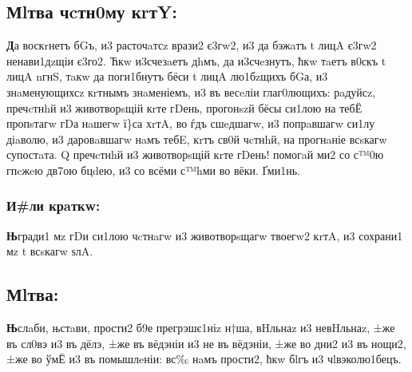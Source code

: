 \subsection{Мlтва чcтн0му кrтY:}

\textbf{Д}а воскrнетъ бGъ, и3 расточaтсz врази2 є3гw2, и3 да бэжaтъ t лицA є3гw2
ненави1дzщіи є3го2. Ћкw и3счезaетъ дhмъ, да и3счeзнутъ, ћкw тaетъ в0скъ
t лицA nгнS, тaкw да поги1бнутъ бёси t лицA лю1бzщихъ бGа, и3
знaменующихсz кrтнымъ знaменіемъ, и3 въ весeліи глаг0лющихъ: рaдуйсz,
пречcтнhй и3 животворsщій кrте гDень, прогонszй бёсы си1лою на тебЁ
пропsтагw гDа нaшегw ї\}са хrтA, во ѓдъ сшeдшагw, и3 попрaвшагw си1лу
діaволю, и3 даровaвшагw нaмъ тебE, кrтъ св0й чcтнhй, на прогнaніе
всsкагw супостaта. Q пречcтнhй и3 животворsщій кrте гDень! помогaй ми2
со с™0ю гпcжeю дв7ою бцdею, и3 со всёми с™hми во вёки. Ґми1нь.

\subsubsection{И\#ли крaткw:}

\textbf{Њ}гради1 мz гDи си1лою чcтнaгw и3 животворsщагw твоегw2 кrтA, и3 сохрани1
мz t всsкагw ѕлA.

\subsection{Мlтва:}

\textbf{Њ}слaби, њстaви, прости2 б9е прегрэшє1ніz н†ша, вHльнаz и3 невHльнаz, ±же
въ сл0вэ и3 въ дёлэ, ±же въ вёдэніи и3 не въ вёдэніи, ±же во дни2 и3 въ
нощи2, ±же во ўмЁ и3 въ помышлeніи: вс‰ нaмъ прости2, ћкw бlгъ и3
чlвэколю1бецъ.

